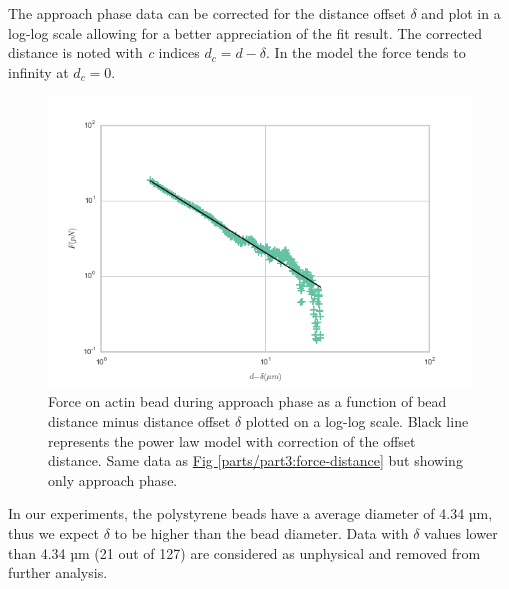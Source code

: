 \documentclass[A4paperpaper,11pt,english]{sphinxmanual}
\begin{document}
The approach phase data can be corrected for the distance offset \(\delta\)
and plot in a log-log scale allowing for a better appreciation of the fit
result. The corrected distance is noted with  \emph{c} indices \(d_c = d-
\delta\). In the model the force tends to infinity at \(d_c = 0\).
\begin{figure}[htbp]
\centering
\capstart

\includegraphics[width=0.800\linewidth]{force-distance-fit-loglog.png}
\caption{Force on actin bead  during approach phase as a function of bead distance
minus distance offset \(\delta\) plotted on a log-log scale. Black line
represents the power law model with  correction of the offset distance. Same
data as \hyperref[parts/part3:force-distance]{Fig  \ref*{parts/part3:force-distance}} but showing only approach phase.}\label{parts/part3:force-distance-log-log}\end{figure}

In our experiments, the polystyrene beads have a average diameter of 4.34 µm,
thus we expect \(\delta\) to be higher than the bead diameter.  Data with
\(\delta\) values lower than 4.34 µm (21 out of 127) are considered as
unphysical and removed from further analysis.
\end{document}
